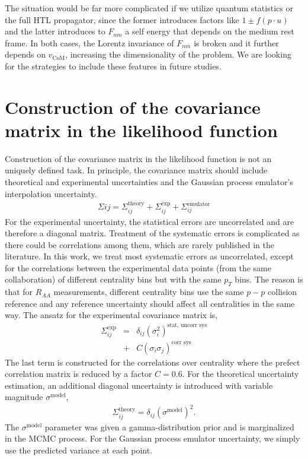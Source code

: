 \documentclass[aps, prc, reprint, amsmath, groupedaddress, nofootinbib]{revtex4-1}
\begin{document}
\begin{appendices}
The situation would be far more complicated if we utilize quantum statistics or the full HTL propagator, since the former introduces factors like $1\pm f(p\cdot u)$ and the latter introduces to $F_{nm}$ a self energy that depends on the medium rest frame.
In both cases, the Lorentz invariance of $F_{nm}$ is broken and it further depends on $v_{\textrm{CoM}}$, increasing the dimensionality of the problem. 
We are looking for the strategies to include these features in future studies.

\section{Construction of the covariance matrix in the likelihood function}
\label{appendix:sigma}
Construction of the covariance matrix in the likelihood function is not an uniquely defined task.
In principle, the covariance matrix should include theoretical and experimental   uncertainties and the Gaussian process emulator's interpolation uncertainty.
\begin{eqnarray}
\Sigma{ij} = \Sigma^{\textrm{theory}}_{ij} + \Sigma^{\textrm{exp}}_{ij} + \Sigma^{\textrm{emulator}}_{ij}
\end{eqnarray}
For the experimental uncertainty, the statistical errors are uncorrelated and are therefore a diagonal matrix. 
Treatment of the systematic errors is complicated as there could be correlations among them, which are rarely published in the literature. 
In this work, we treat most systematic errors as uncorrelated, except for the correlations between the experimental data points (from the same collaboration) of different centrality bins but with the same $p_T$ bins.
The reason is that for $R_{AA}$ measurements, different centrality bins use the same $p-p$ collision reference and any reference uncertainty should affect all centralities in the same way.
The ansatz for the experimental covariance matrix is, 
\begin{eqnarray}
\Sigma^{\textrm{exp}}_{ij} &=& \delta_{ij}\left(\sigma_i^2\right)^{\textrm{stat, uncorr sys}} \nonumber\\
&+& C \left(\sigma_{i}\sigma_{j}\right)^{\textrm{corr sys}}
\end{eqnarray}
The last term is constructed for the correlations over centrality where the prefect correlation matrix is reduced by a factor $C=0.6$.
For the theoretical uncertainty estimation, an additional diagonal uncertainty is introduced with variable magnitude $\sigma^{\textrm{model}}$,
\begin{eqnarray}
\Sigma^{\textrm{theory}}_{ij} = \delta_{ij}(\sigma^{\textrm{model}})^2.
\end{eqnarray}
The $\sigma^{\textrm{model}}$ parameter was given a gamma-distribution prior and is marginalized in the MCMC process.
For the Gaussian process emulator uncertainty, we simply use the predicted variance at each point.
\end{appendices}
 
\end{document}
